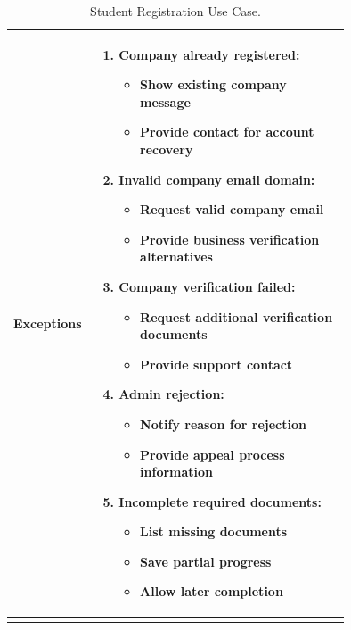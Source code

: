 \begin{center}
\begin{longtable}{|l|p{0.75\linewidth}|}
        \hline
        \textbf{Exceptions}       & 
        \begin{enumerate}
            \item \textbf{Company already registered:}
            \begin{itemize}
                \item Show existing company message
                \item Provide contact for account recovery
            \end{itemize}
            \item \textbf{Invalid company email domain:}
            \begin{itemize}
                \item Request valid company email
                \item Provide business verification alternatives
            \end{itemize}
            \item \textbf{Company verification failed:}
            \begin{itemize}
                \item Request additional verification documents
                \item Provide support contact
            \end{itemize}
            \item \textbf{Admin rejection:}
            \begin{itemize}
                \item Notify reason for rejection
                \item Provide appeal process information
            \end{itemize}
            \item \textbf{Incomplete required documents:}
            \begin{itemize}
                \item List missing documents
                \item Save partial progress
                \item Allow later completion
            \end{itemize}
        \end{enumerate} \\
        \hline
        \caption{Student Registration Use Case.}
        \label{tab:student_registration_use_case}
    \end{longtable}
\end{center}

